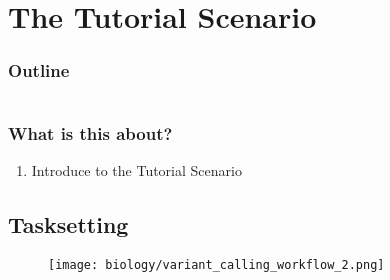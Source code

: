 \section{The Tutorial Scenario}

\begin{frame}
    \frametitle{Outline}
    \begin{columns}[t]
        \begin{column}{.5\textwidth}
            \tableofcontents[sections={1-7},currentsection]
        \end{column}
        \begin{column}{.5\textwidth}
            \tableofcontents[sections={8-15},currentsection]
        \end{column}
    \end{columns}
\end{frame}

\begin{frame}
	\frametitle{What is this about?}
	\begin{docs}[Objective]
		\begin{enumerate}
			\item Introduce to the Tutorial Scenario 
		\end{enumerate}
	\end{docs}
\end{frame}

\subsection{Tasksetting}

\begin{frame}
  \begin{figure}
    \centering
    \texttt{[image: biology/variant\_calling\_workflow\_2.png]}
  \end{figure}
\end{frame}




